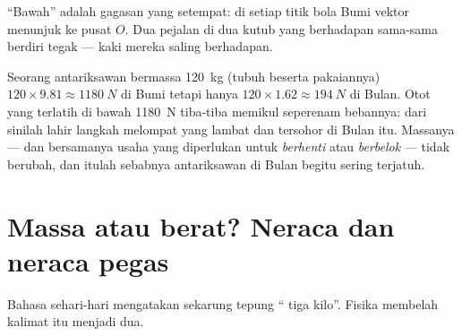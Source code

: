 \begin{omfigure}

{\small ``Bawah'' adalah gagasan yang setempat: di setiap titik bola
Bumi vektor  menunjuk ke pusat $O$. Dua pejalan di dua kutub
yang berhadapan sama-sama berdiri tegak --- kaki mereka saling
berhadapan.}
\end{omfigure}

\begin{remark}\label{rem:g10:universal-gravitation:bounce}
Seorang antariksawan bermassa \qty{120}{kg} (tubuh beserta pakaiannya)
 $120 \times 9.81 \approx \qty{1180}{N}$ di Bumi tetapi hanya
$120 \times 1.62 \approx \qty{194}{N}$ di Bulan. Otot yang terlatih di
bawah \qty{1180}{N} tiba-tiba memikul seperenam bebannya: dari sinilah
lahir langkah melompat yang lambat dan tersohor di Bulan itu. Massanya
--- dan bersamanya usaha yang diperlukan untuk \emph{berhenti} atau
\emph{berbelok} --- tidak berubah, dan itulah sebabnya antariksawan di
Bulan begitu sering terjatuh.
\end{remark}

\section{Massa atau berat? Neraca dan neraca pegas}

Bahasa sehari-hari mengatakan sekarung tepung `` tiga kilo''.
Fisika membelah kalimat itu menjadi dua.

